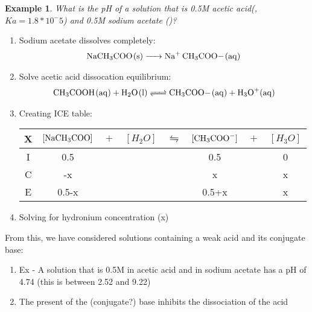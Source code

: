 \documentclass{article}  %
\newtheorem{exmp}{Example}
\begin{document}
\begin{exmp}
    What is the pH of a solution that is 0.5M acetic acid(, $Ka = 1.8*10^-5$) and 0.5M sodium acetate ()?
\end{exmp}
\begin{enumerate}
    \item Sodium acetate dissolves completely:
    \begin{equation*}
        \begin{aligned}
            \ce{NaCH3COO_(s) -> Na+ CH3COO-_(aq)}
        \end{aligned}
    \end{equation*}
    \item Solve acetic acid dissocation equilibrium:
    \begin{equation*}
        \begin{aligned}
            \ce{CH3COOH_(aq) + H2O_(l) <=> CH3COO-_(aq) + H3O+_(aq)}
        \end{aligned}
    \end{equation*}
    \item Creating ICE table: %
    \begin{tabular}{c|c@{}c@{}c@{}c@{}c@{}c@{}c}
        \hline
        X   & $[\ce{NaCH3COO_}]$ & ${}+{}$ & $[H_2O]$ & ${}\leftrightharpoons{}$ & $[\ce{CH3COO-}]$ & ${}+{}$ & $[H_3O]$ \\
        \hline
        I   &  0.5    &&     &&  0.5    && 0  \\
        C   &  -x     &&     &&  x      && x   \\
        E   &  0.5-x  &&     &&  0.5+x  && x  \\      
    \end{tabular}
    \item Solving for hydronium concentration (x)
\end{enumerate}
From this, we have considered solutions containing a weak acid and its conjugate base:
\begin{enumerate}
    \item Ex - A solution that is 0.5M in acetic acid and in sodium acetate has a pH of 4.74 (this is between 2.52 and 9.22)
    \item The present of the (conjugate?) base inhibits the dissociation of the acid
\end{enumerate}
\end{document}
